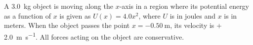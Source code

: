 \documentclass{../../oss-apphys-exam}
\begin{document}
\begin{questions}
%    
%    
  
  \question A \SI{3.0}{\kilo\gram} object is moving along the $x$-axis in a
  region where its potential energy as a function of $x$ is given as
  $U(x)=4.0x^2$, where $U$ is in joules and $x$ is in meters. When the object
  passes the point $x=\SI{-0.50}\metre$, its velocity is
  $+$\SI{2.0}{\metre\per\second}. All forces acting on the object are
  conservative.
\end{questions}
\end{document}

